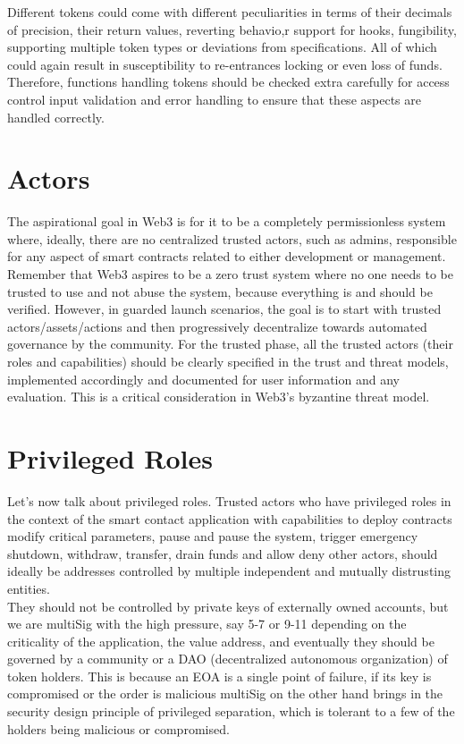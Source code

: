 Different tokens could come with different peculiarities in terms of their decimals of precision, their return values, reverting behavio,r support for hooks, fungibility, supporting multiple token types or deviations from specifications. All of which could again result in susceptibility to re-entrances locking or even loss of funds. Therefore, functions handling tokens should be checked extra carefully for access control input validation and error handling to ensure that these aspects are handled correctly.

\section{Actors}
The aspirational goal in Web3 is for it to be a completely permissionless system where, ideally, there are no centralized trusted actors, such as admins, responsible for any aspect of smart contracts related to either development or management. Remember that Web3 aspires to be a zero trust system where no one needs to be trusted to use and not abuse the system, because everything is and should be verified. However, in guarded launch scenarios, the goal is to start with trusted actors/assets/actions and then progressively decentralize towards automated governance by the community. For the trusted phase, all the trusted actors (their roles and capabilities) should be clearly specified in the trust and threat models, implemented accordingly and documented for user information and any evaluation. This is a critical consideration in Web3's byzantine threat model.

\section{Privileged Roles}
Let's now talk about privileged roles. Trusted actors who have privileged roles in the context of the smart contact application with capabilities to deploy contracts modify critical parameters, pause and pause the system, trigger emergency shutdown, withdraw, transfer, drain funds and allow deny other actors, should ideally be addresses controlled by multiple independent and mutually distrusting entities.\\

They should not be controlled by private keys of externally owned accounts, but we are multiSig with the high pressure, say 5-7 or 9-11 depending on the criticality of the application, the value address, and eventually they should be governed by a community or a DAO (decentralized autonomous organization) of token holders. This is because an EOA is a single point of failure, if its key is compromised or the order is malicious multiSig on the other hand brings in the security design principle of privileged separation, which is tolerant to a few of the holders being malicious or compromised.

